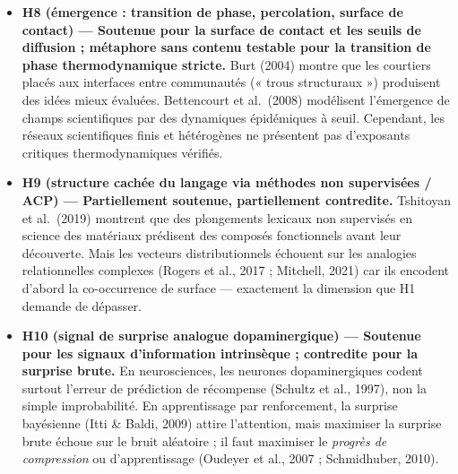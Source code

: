 \documentclass[a4paper,11pt]{article}
\begin{document}
\begin{itemize}
\item
  \textbf{H8 (émergence : transition de phase, percolation, surface de
  contact) --- Soutenue pour la surface de contact et les seuils de
  diffusion ; métaphore sans contenu testable pour la transition de
  phase thermodynamique stricte.} Burt (2004) montre que les courtiers
  placés aux interfaces entre communautés (« trous structuraux »)
  produisent des idées mieux évaluées. Bettencourt et al.~(2008)
  modélisent l'émergence de champs scientifiques par des dynamiques
  épidémiques à seuil. Cependant, les réseaux scientifiques finis et
  hétérogènes ne présentent pas d'exposants critiques thermodynamiques
  vérifiés.
\item
  \textbf{H9 (structure cachée du langage via méthodes non supervisées /
  ACP) --- Partiellement soutenue, partiellement contredite.} Tshitoyan
  et al.~(2019) montrent que des plongements lexicaux non supervisés en
  science des matériaux prédisent des composés fonctionnels avant leur
  découverte. Mais les vecteurs distributionnels échouent sur les
  analogies relationnelles complexes (Rogers et al., 2017 ; Mitchell,
  2021) car ils encodent d'abord la co-occurrence de surface ---
  exactement la dimension que H1 demande de dépasser.
\item
  \textbf{H10 (signal de surprise analogue dopaminergique) --- Soutenue
  pour les signaux d'information intrinsèque ; contredite pour la
  surprise brute.} En neurosciences, les neurones dopaminergiques codent
  surtout l'erreur de prédiction de récompense (Schultz et al., 1997),
  non la simple improbabilité. En apprentissage par renforcement, la
  surprise bayésienne (Itti \& Baldi, 2009) attire l'attention, mais
  maximiser la surprise brute échoue sur le bruit aléatoire ; il faut
  maximiser le \emph{progrès de compression} ou d'apprentissage (Oudeyer
  et al., 2007 ; Schmidhuber, 2010).
\end{itemize}
\end{document}
